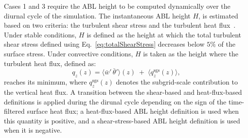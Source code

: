 Cases 1 and 3 require the ABL height to be computed dynamically over the diurnal cycle of the simulation. The instantaneous ABL height \(H\), is estimated based 
on two criteria: the turbulent shear stress and the turbulent heat flux~\citep{allaerts2015large}. Under stable conditions, \( H \) is defined as the height at which the total turbulent 
shear stress defined using Eq.~\ref{eq:totalShearStress} decreases below \(5\%\) of the surface stress. Under convective conditions, 
\( H \) is taken as the height where the turbulent heat flux, defined as:
\begin{equation}
q_{z}(z) 
= \bigl\langle \bar{w}'\,\bar{\theta}' \bigr\rangle(z)
\; + \;\bigl\langle q_{z}^{\mathrm{sgs}}(z)\bigr\rangle,
\label{eq:geoABL}
\end{equation}
reaches its minimum, where \( q_{z}^{\mathrm{sgs}}(z) \) denotes the subgrid-scale contribution to the vertical 
heat flux. A transition between the shear-based and 
heat-flux-based definitions is applied during the dirunal cycle depending on the sign of the time-filtered surface heat flux; a heat-flux-based ABL height definition is used when this quantity is positive, and a shear-stress-based ABL height definition is used when it is negative.

